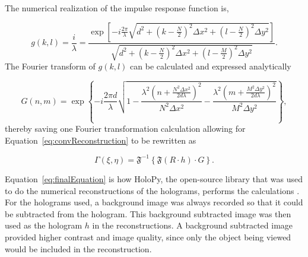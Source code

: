 
    The numerical realization of the impulse response function is,

    \begin{equation}
        g(k,l)=\frac{i}{\lambda}=\frac{\exp\left[
        -i\frac{2\pi}{\lambda}\sqrt{d^2+\left(k-\frac{N}{2}\right)^2\Delta x^2+\left(
        l-\frac{N}{2}
    \right)^{2}\Delta y^2} \right]}{\sqrt{d^2+\left(k-\frac{N}{2}\right)^2\Delta x^2+\left(
        l-\frac{M}{2}
    \right)^{2}\Delta y^2}} .
    \end{equation}
    The Fourier transform of $g(k,l)$ can be calculated and expressed
    analytically

    \begin{equation}
        G(n,m) = \exp\left\{ -i\frac{2\pi
        d}{\lambda}\sqrt{1-\frac{\lambda^{2}\left( n+\frac{N^2\Delta
        x^2}{2d\lambda} \right)^2}{N^2\Delta x^2}-\frac{\lambda^{2}\left( m+\frac{M^2\Delta
        y^2}{2d\lambda} \right)^2}{M^2\Delta y^2}} \right\} ,
    \end{equation}
    thereby saving one Fourier transformation calculation allowing for
    Equation~\ref{eq:convReconstruction} to be rewritten as

    \begin{equation}
        \Gamma(\xi,\eta) = \mathfrak{F}^{-1}\left\{ \mathfrak{F}(R\cdot h)
        \cdot G \right\} .
        \label{eq:finalEquation}
    \end{equation}

    Equation~\ref{eq:finalEquation} is how HoloPy, the open-source library that
    was used to do the numerical reconstructions of the holograms, performs
    the calculations \cite{Manoharan}. For the holograms used, a background image was always
    recorded so that it could be subtracted from the hologram. This background
    subtracted image was then used as the hologram $h$ in the reconstructions.
    A background subtracted image provided higher contrast and image quality, 
    since only the object being viewed
    would be included in the reconstruction.

